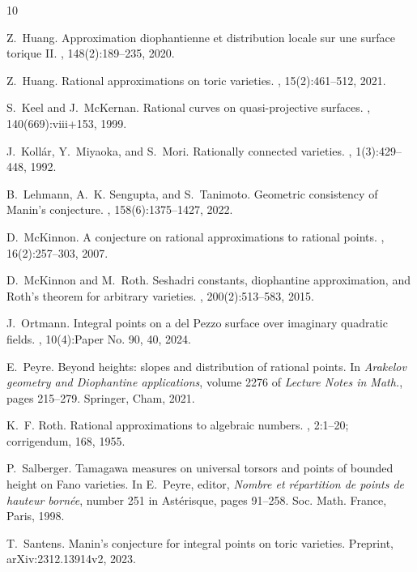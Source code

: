 \documentclass[a4paper, twoside, 11pt]{amsart}
\theoremstyle{definition}
\begin{document}
\begin{thebibliography}{10}
{
Z.~Huang.
\newblock Approximation diophantienne et distribution locale sur une surface torique {II}.
, 148(2):189--235, 2020.

Z.~Huang.
\newblock Rational approximations on toric varieties.
, 15(2):461--512, 2021.

S.~Keel and J.~McKernan.
\newblock Rational curves on quasi-projective surfaces.
, 140(669):viii+153, 1999.

J.~Koll\'ar, Y.~Miyaoka, and S.~Mori.
\newblock Rationally connected varieties.
, 1(3):429--448, 1992.

B.~Lehmann, A.~K. Sengupta, and S.~Tanimoto.
\newblock Geometric consistency of {M}anin's conjecture.
, 158(6):1375--1427, 2022.

D.~McKinnon.
\newblock A conjecture on rational approximations to rational points.
, 16(2):257--303, 2007.

D.~McKinnon and M.~Roth.
\newblock Seshadri constants, diophantine approximation, and {R}oth's theorem for arbitrary varieties.
, 200(2):513--583, 2015.

J.~Ortmann.
\newblock Integral points on a del {P}ezzo surface over imaginary quadratic fields.
, 10(4):Paper No. 90, 40, 2024.

E.~Peyre.
\newblock Beyond heights: slopes and distribution of rational points.
\newblock In {\em Arakelov geometry and {D}iophantine applications}, volume 2276 of {\em Lecture Notes in Math.}, pages 215--279. Springer, Cham, 2021.

K.~F. Roth.
\newblock Rational approximations to algebraic numbers.
, 2:1--20; corrigendum, 168, 1955.

P.~Salberger.
\newblock Tamagawa measures on universal torsors and points of bounded height on {F}ano varieties.
\newblock In E.~Peyre, editor, {\em Nombre et r\'epartition de points de hauteur born\'ee}, number 251 in Ast\'erisque, pages 91--258. Soc. Math. France, Paris, 1998.

T.~Santens.
\newblock Manin's conjecture for integral points on toric varieties.
\newblock Preprint, arXiv:2312.13914v2, 2023.

}
\end{thebibliography}
\end{document}
